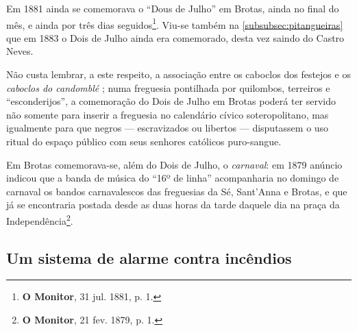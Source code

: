 Em 1881 ainda se comemorava o ``Dous de Julho'' em Brotas, ainda no final do mês, e ainda por três dias seguidos\footnote{\textbf{O Monitor}, 31 jul. 1881, p. 1.}. Viu-se também na \autoref{subsubsec:pitangueiras} que em 1883 o Dois de Julho ainda era comemorado, desta vez saindo do Castro Neves.

Não custa lembrar, a este respeito, a associação entre os caboclos dos festejos e os \textit{caboclos do candomblé} \cite[p.~88-91]{albuquerque_doisdejulho_1997}; numa freguesia pontilhada por quilombos, terreiros e ``esconderijos'', a comemoração do Dois de Julho em Brotas poderá ter servido não somente para inserir a freguesia no calendário cívico soteropolitano, mas igualmente para que negros --- escravizados ou libertos --- disputassem o uso ritual do espaço público com seus senhores católicos puro-sangue. 

Em Brotas comemorava-se, além do Dois de Julho, o \textit{carnaval}: em 1879 anúncio indicou que a banda de música do ``16º de linha'' acompanharia no domingo de carnaval os bandos carnavalescos das freguesias da Sé, Sant'Anna e Brotas, e que já se encontraria postada desde as duas horas da tarde daquele dia na praça da Independência\footnote{\textbf{O Monitor}, 21 fev. 1879, p. 1.}.

\subsection{Um sistema de alarme contra incêndios}

